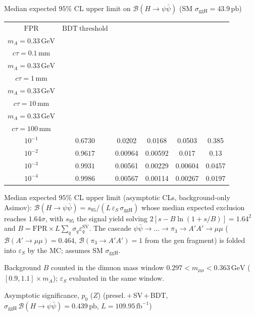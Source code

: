 \documentclass[10pt,a4paper]{article}
\begin{document}
{\vspace{12pt}

Median expected $95\%$ CL upper limit on $\mathcal{B}(H\to\psi\bar{\psi})$ (SM $\sigma_{\mathrm{ggH}}=43.9\,\mathrm{pb}$)

\begin{tabular}{cccccc}
\toprule
$\mathrm{FPR}$ & $\mathrm{BDT\ threshold}$ & \shortstack{$m_{\pi}=1\,\mathrm{GeV}$\\$m_{A}=0.33\,\mathrm{GeV}$\\$c\tau=0.1\,\mathrm{mm}$} & \shortstack{$m_{\pi}=1\,\mathrm{GeV}$\\$m_{A}=0.33\,\mathrm{GeV}$\\$c\tau=1\,\mathrm{mm}$} & \shortstack{$m_{\pi}=1\,\mathrm{GeV}$\\$m_{A}=0.33\,\mathrm{GeV}$\\$c\tau=10\,\mathrm{mm}$} & \shortstack{$m_{\pi}=1\,\mathrm{GeV}$\\$m_{A}=0.33\,\mathrm{GeV}$\\$c\tau=100\,\mathrm{mm}$} \\
\midrule
$10^{-1}$ & $0.6730$ & 0.0202 & 0.0168 & 0.0503 & 0.385\\
$10^{-2}$ & $0.9617$ & 0.00964 & 0.00592 & 0.017 & 0.13\\
$10^{-3}$ & $0.9931$ & 0.00561 & 0.00229 & 0.00604 & 0.0457\\
$10^{-4}$ & $0.9986$ & 0.00567 & 0.00114 & 0.00267 & 0.0197\\
\bottomrule
\end{tabular}

{\small Median expected $95\%$ CL upper limit (asymptotic CLs, background-only Asimov): $\mathcal{B}(H\to\psi\bar{\psi})=s_{95}/(L\,\varepsilon_S\,\sigma_{\mathrm{ggH}})$ whose median expected exclusion reaches $1.64\sigma$, with $s_{95}$ the signal yield solving $2[s-B\ln(1{+}s/B)]=1.64^2$ and $B=\mathrm{FPR}\times L\sum_q\sigma_q\varepsilon_q^{\mathrm{SV}}$. The cascade $\psi\bar{\psi}\to\ldots\to\pi_3\to A'A'\to\mu\mu$ ($\mathcal{B}(A'\to\mu\mu)=0.464$, $\mathcal{B}(\pi_3\to A'A')=1$ from the gen fragment) is folded into $\varepsilon_S$ by the MC; assumes SM $\sigma_{\mathrm{ggH}}$.}

{\small Background $B$ counted in the dimuon mass window $0.297<m_{\mu\mu}<0.363\,\mathrm{GeV}$ ($[0.9,1.1]\times m_A$); $\varepsilon_S$ evaluated in the same window.}

\vspace{12pt}

Asymptotic significance, $p_0$ ($Z$) (presel.\,$+$\,SV\,$+$\,BDT, $\sigma_{\mathrm{ggH}}\,\mathcal{B}(H\to\psi\bar{\psi})=0.439\,\mathrm{pb}$, $L=109.95\,\mathrm{fb}^{-1}$)

}
\end{document}
